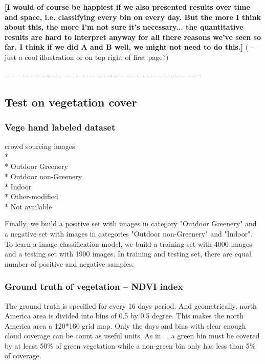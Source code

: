 \textbf{
[I would of course be happiest if we also presented results over time and space, i.e. classifying every bin on every day. But the more I think about this, the more I'm not sure it's necessary... the quantitative results are hard to interpret anyway for all there reasons we've seen so far. I think if we did A and B well, we might not need to do this.]
}( -- just a cool illustration or on top right of first page?)

\hfill \break
\hfill \break
===================================
\hfill \break
\hfill \break

\subsection{Test on vegetation cover}
\subsubsection*{Vege hand labeled dataset}

crowd sourcing images\\*\\*
Outdoor Greenery\\*
Outdoor non-Greenery\\*
Indoor\\*
Other-modified\\*
Not available

Finally, we build a positive set with images in category "Outdoor Greenery" and a negative set with images in categories "Outdoor non-Greenery" and "Indoor". To learn a image classification model, we build a training set with 4000 images and a testing set with 1900 images. In training and testing set, there are equal number of positive and negative samples.

\subsubsection*{Ground truth of vegetation -- NDVI index}
The ground truth is specified for every 16 days period. 
And geometrically, north America area is divided into bins of 0.5 by 0.5 degree. This makes the north America area a 120*160 grid map.
Only the days and bins with clear enough cloud coverage can be count as useful units. As in ~\cite{www paper}, a green bin must be covered by at least 50\% of green vegetation while a non-green bin only has less than 5\% of coverage.


